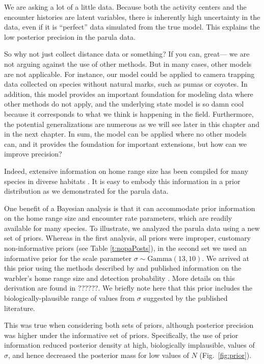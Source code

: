 We are asking a lot of a little data. Because both the activity
centers and the encounter histories are latent variables, there is
inherently high uncertainty in the data, even if it is ``perfect''
data simulated from the true model. This explains the low posterior
precision in the parula data.

So why not just collect distance data or something? If you can, great---
we are not arguing against the use of other methods. But in many
cases, other models are not applicable. For instance, our model could
be applied to camera trapping data collected on species without
natural marks, such as pumas or coyotes. In addition, this
model provides an important foundation for modeling data where other
methods do not apply, and the underlying state model is so damn cool
because it corresponds to what we think is happening in the field.
Furthermore, the potential generalizations are numerous as we
will see later in this chapter and in the next chapter. In sum, the
model can be applied where no other models can, and it provides the
foundation for important extensions, but how can we improve precision?

Indeed, extensive information on home range size has
been compiled for many species in diverse habitats %
\citep[\emph{e.g.},][]{degraaf_yamasaki:2001}. It is
easy to embody this information in a prior distribution as we
demonstrated for the parula data.


One benefit of a Bayesian analysis is that it can accommodate prior
information on the home range size and encounter rate parameters,
which are readily available for many
species. To illustrate, we analyzed the parula data using a new set of
priors. Whereas in the first analysis, all priors were
improper, customary non-informative priors (see Table \ref{t:nopaPosts}),
in the second set we used
an informative prior for the scale parameter $\sigma \sim
\mbox{Gamma}(13,10)$. We arrived at this prior using the methods
described by \citet{royle_etal:2011mee} and published
information on the warbler's home range size and detection probability
\citep{moldenhaer_regelski:1996,simons_etal:2009}. More details on this
derivation are found in ??????. We briefly note here that this prior
includes the biologically-plausible range of values from $\sigma$
suggested by the published literature.


This was true when
considering
both sets of priors, although posterior precision was higher under the
informative set of priors. Specifically, the use of prior information
reduced posterior density at high, biologically implausible,
values of $\sigma$, and hence decreased the posterior mass for
low values of $N$ (Fig.~\ref{fig:prior}).



